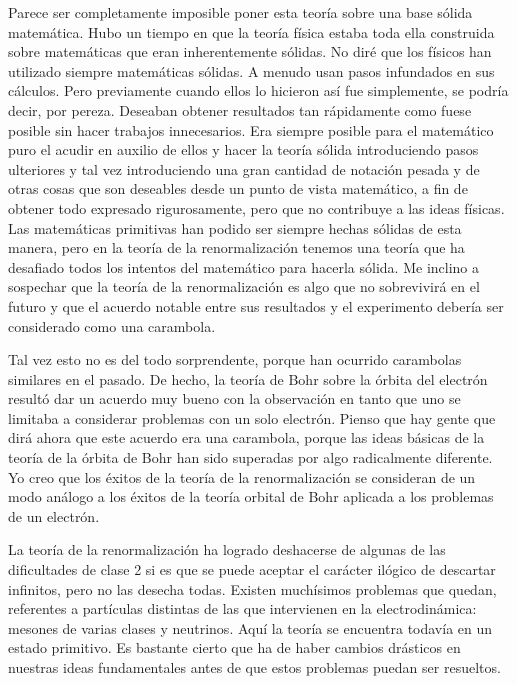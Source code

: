 \documentclass[a4paper, 12pt]{article}
\begin{document}
Parece ser completamente imposible poner esta teoría sobre una base sólida matemática. Hubo un tiempo en que la teoría física estaba toda ella construida sobre matemáticas que eran inherentemente sólidas. No diré que los físicos han utilizado siempre matemáticas sólidas. A menudo usan pasos infundados en sus cálculos. Pero previamente cuando ellos lo hicieron así fue simplemente, se podría decir, por pereza. Deseaban obtener resultados tan rápidamente como fuese posible sin hacer  trabajos innecesarios. Era siempre posible para el matemático puro el acudir en auxilio de ellos y hacer la teoría sólida introduciendo pasos ulteriores y tal vez introduciendo una gran cantidad de notación pesada y de otras cosas que son deseables desde un punto de vista matemático, a fin de obtener todo expresado rigurosamente, pero que no contribuye a las ideas físicas. Las matemáticas primitivas han podido ser siempre hechas sólidas de esta manera, pero en la teoría de la renormalización tenemos una teoría que ha desafiado todos los intentos del matemático para hacerla sólida. Me inclino a sospechar que la teoría de la renormalización es algo que no sobrevivirá en el futuro y que el acuerdo notable entre sus resultados y el experimento debería ser considerado como una carambola.

Tal vez esto no es del todo sorprendente, porque han ocurrido carambolas similares en el pasado. De hecho, la teoría de Bohr sobre la órbita del electrón resultó dar un acuerdo muy bueno con la observación en tanto que uno se limitaba a considerar problemas con un solo electrón. Pienso que hay gente que dirá ahora que este acuerdo era una carambola, porque las ideas básicas de la teoría de la órbita de Bohr han sido superadas por algo radicalmente diferente. Yo creo que los éxitos de la teoría de la renormalización se consideran de un modo análogo a los éxitos de la teoría orbital de Bohr aplicada a los problemas de un electrón.

La teoría de la renormalización ha logrado deshacerse de algunas de las dificultades de clase 2 si es que se puede aceptar el carácter ilógico de descartar infinitos, pero no las desecha todas. Existen muchísimos problemas que quedan, referentes a partículas distintas de las que intervienen en la electrodinámica: mesones de varias clases y neutrinos. Aquí la teoría se encuentra todavía en un estado primitivo. Es bastante cierto que ha de haber cambios drásticos en nuestras ideas fundamentales antes de que estos problemas puedan ser resueltos.
\end{document}
